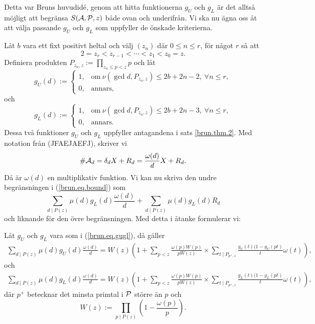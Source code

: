 Detta var Bruns huvudidé, genom att hitta funktionerna $g_U$ och $g_L$ är det alltså möjligt att begränsa $\S{A}{P}{z}$ både ovan och underifrån. Vi ska nu ägna oss åt att välja passande $g_U$ och $g_L$ som uppfyller de önskade kriterierna.

Låt $b$ vara ett fixt positivt heltal och välj $(z_n)$ där $0 \leq n \leq r$, för något $r$ så att
\begin{equation*}
    2 = z_r < z_{r-1} < \cdots < z_1 < z_0 = z.
\end{equation*}
Definiera produkten $P_{z_n, z} := \prod_{z_n \leq p < z} p$ och låt
\begin{equation*}
    g_U(d) :=
    \begin{cases}
        1, & \text{om}\ \nu(\gcd{d, P_{z_n, z}}) \leq 2b+2n-2,\ \forall n \leq r, \\
        0, & \text{annars,}
    \end{cases}
\end{equation*}
och
\begin{equation} \label{brun.eq.gugl}
    g_L(d) :=
    \begin{cases}
        1, & \text{om}\ \nu(\gcd{d, P_{z_n, z}}) \leq 2b+2n-3,\ \forall n \leq r, \\
        0, & \text{annars.}
    \end{cases}
\end{equation}
Dessa två funktioner $g_U$ och $g_L$ uppfyller antagandena i sats \ref{brun.thm.2}. Med notation från (JFAEJAEFJ), skriver vi
\begin{equation*} \label{brun.eq.omega}
        \card{\A_d} = \delta_d X + R_d = \frac{\omega(d)}{d} X + R_d.
\end{equation*}
Då är $\omega(d)$ en multiplikativ funktion. Vi kan nu skriva den undre begränsningen i (\ref{brun.eq.bound}) som 
\begin{equation*}
    \sum_{d\mid P(z)}\mu(d)g_L(d)\frac{\omega(d)}{d} +
    \sum_{d \mid P(z)} \mu(d) g_L(d) R_d
\end{equation*}
och liknande för den övre begränsningen. Med detta i åtanke formulerar vi:


\begin{lemma} \label{brun.lem.1}
Låt $g_U$ och $g_L$ vara som i (\ref{brun.eq.gugl}), då gäller
\begin{align*}
    \sum_{d\mid P(z)}\mu(d)g_U(d)\frac{\omega(d)}{d} =
    W(z)\left(1 + \sum_{p<z}\frac{\omega(p)W(p)}{pW(z)} \times \sum_{t\mid P_{p^+,z}}\frac{g_U(t)(1-g_U(pt)}{t}\omega(t)\right),
\end{align*}
och
\begin{align*} \label{brun.eq.sum}
    \sum_{d\mid P(z)}\mu(d)g_L(d)\frac{\omega(d)}{d} =
    W(z)\left(1 + \sum_{p<z}\frac{\omega(p)W(p)}{pW(z)} \times \sum_{t\mid P_{p^+,z}}\frac{g_L(t)(1-g_L(pt)}{t}\omega(t)\right),
\end{align*}
där $p^+$ betecknar det minsta primtal i $\P$ större än $p$ och
\begin{equation*}
    W(z) := \prod_{p\mid P(z)}\left(1 - \frac{\omega(p)}{p} \right).
\end{equation*}


\end{lemma}


